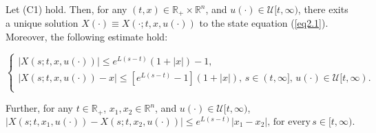 \begin{prop}\label{prop2.1.1}
	Let (C1) hold. Then, for any $(t,x)\in\mathbb{R}_{+}\times\mathbb{R}^n$, 
	and $u(\cdot)\in \mathcal{U}[t,\infty)$, there exits a unique solution 
	$X(\cdot)\equiv X(\cdot;t,x,u(\cdot))$ to the state equation (\ref{eq2.1}). 
	Moreover, the following estimate hold:
	
	\begin{equation}\label{eq2.2}
	\left\{ \begin{array}{l}
	|X(s;t,x,u(\cdot))|\leq e^{L(s-t)}(1+|x|)-1, \\
	|X(s;t,x,u(\cdot))-x|\leq [e^{L(s-t)}-1](1+|x|),\, s\in (t,\infty],\, 
	u(\cdot)\in \mathcal{U}[t,\infty).\\
	\end{array}
	\right.
	\end{equation} 
	
	Further, for any $t\in \mathbb{R}_{+}$, $x_1,x_2\in \mathbb{R}^n$, and 
	$u(\cdot)\in \mathcal{U}[t,\infty)$,
	\begin{equation}\label{eq2.3}
	|X(s;t,x_1,u(\cdot))-X(s;t,x_2,u(\cdot))|\leq 
	e^{L(s-t)}|x_1-x_2|,\,\mbox{for every}\, s\in [t,\infty).
	\end{equation}
\end{prop}


